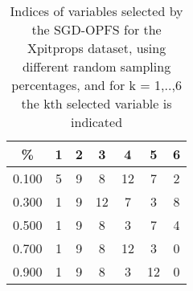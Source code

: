 \begin{table}
	\begin{center}
		\begin{tabular}{c c c c c c c}
			\% & 1 & 2 & 3 & 4 & 5 & 6 \\
			\hline
			0.100 & 5 & 9 & 8 & 12 & 7 & 2 \\
			0.300 & 1 & 9 & 12 & 7 & 3 & 8 \\
			0.500 & 1 & 9 & 8 & 3 & 7 & 4 \\
			0.700 & 1 & 9 & 8 & 12 & 3 & 0 \\
			0.900 & 1 & 9 & 8 & 3 & 12 & 0 \\
		\end{tabular}
	\end{center}
	\caption{Indices of variables selected by the SGD-OPFS for the Xpitprops dataset, using different random sampling percentages, and for k = 1,..,6 the kth selected variable is indicated}
\end{table}